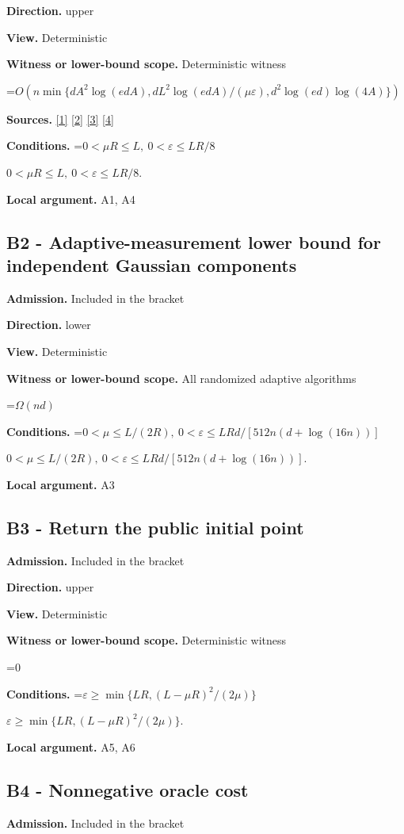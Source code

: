 \documentclass[10pt,a4paper]{article}
\newcommand{\AtlasMath}[1]{\par\begingroup\centering\setbox0=\hbox{$\displaystyle #1$}\ifdim\wd0>1.4\linewidth\typeout{ATLAS WIDE FORMULA: \the\wd0}\fi\ifdim\wd0>\linewidth\resizebox{\linewidth}{!}{\box0}\else\box0\fi\par\endgroup}
\newcommand{\AtlasInlineMath}[1]{\begingroup\setbox0=\hbox{$#1$}\ifdim\wd0>.4\linewidth\endgroup\AtlasMath{#1}\else\endgroup$#1$\fi}
\begin{document}
\textbf{Direction.} upper

\textbf{View.} Deterministic

\textbf{Witness or lower-bound scope.} Deterministic witness

\AtlasMath{O\!\left(n\min\{dA^2\log(edA),dL^2\log(edA)/(\mu\varepsilon),d^2\log(ed)\log(4A)\}\right)}
\textbf{Sources.} \href{https://arxiv.org/html/2607.16558v2}{[1]} \href{https://www.mathnet.ru/php/archive.phtml?jrnid=mzm&option_lang=eng&paperid=1697&wshow=paper}{[2]} \href{https://arxiv.org/html/2610.00345v1}{[3]} \href{https://arxiv.org/abs/2109.08858}{[4]}

\textbf{Conditions.} \AtlasInlineMath{0<\mu R\le L,\ 0<\varepsilon\le LR/8}.

\textbf{Local argument.} A1, A4

\subsection{B2 - Adaptive-measurement lower bound for independent Gaussian components}
\textbf{Admission.} Included in the bracket

\textbf{Direction.} lower

\textbf{View.} Deterministic

\textbf{Witness or lower-bound scope.} All randomized adaptive algorithms

\AtlasMath{\Omega(nd)}
\textbf{Conditions.} \AtlasInlineMath{0<\mu\le L/(2R),\ 0<\varepsilon\le LRd/[512n(d+\log(16n))]}.

\textbf{Local argument.} A3

\subsection{B3 - Return the public initial point}
\textbf{Admission.} Included in the bracket

\textbf{Direction.} upper

\textbf{View.} Deterministic

\textbf{Witness or lower-bound scope.} Deterministic witness

\AtlasMath{0}
\textbf{Conditions.} \AtlasInlineMath{\varepsilon\ge\min\{LR,(L-\mu R)^2/(2\mu)\}}.

\textbf{Local argument.} A5, A6

\subsection{B4 - Nonnegative oracle cost}
\textbf{Admission.} Included in the bracket
\end{document}
